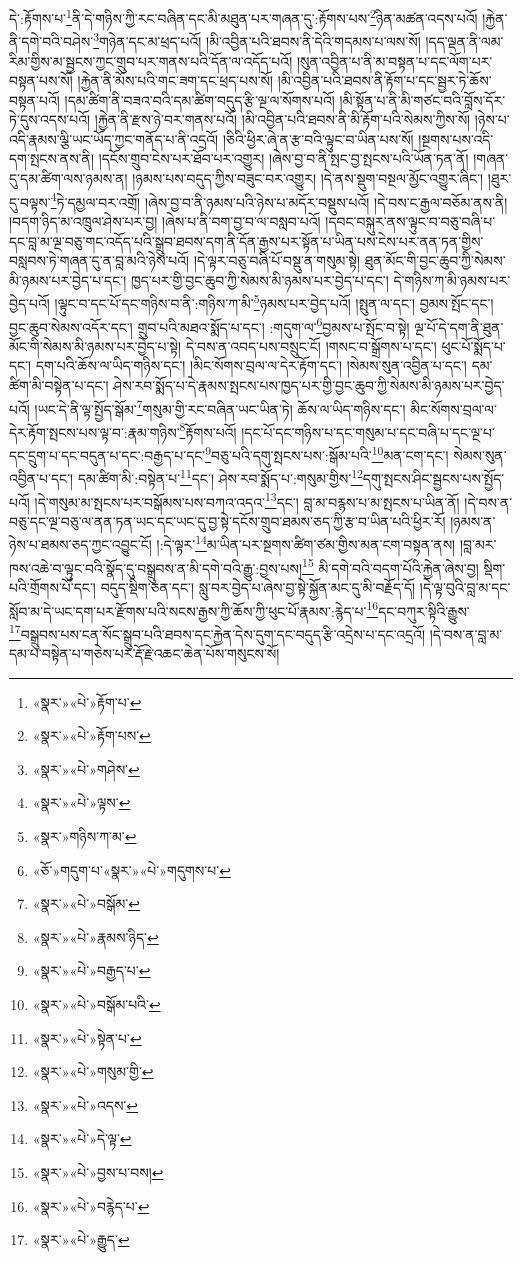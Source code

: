 དེ་:རྟོགས་པ་\footnote{«སྣར་»«པེ་»རྟོག་པ་}ནི་དེ་གཉིས་ཀྱི་རང་བཞིན་དང་མི་མཐུན་པར་གཞན་དུ་:རྟོགས་པས་\footnote{«སྣར་»«པེ་»རྟོག་པས་}ཉིན་མཚན་འདས་པའོ། །རྐྱེན་ནི་དགེ་བའི་བཤེས་\footnote{«སྣར་»«པེ་»གཤེས་}གཉེན་དང་མ་ཕྲད་པའོ། །མི་འབྱིན་པའི་ཐབས་ནི་དེའི་གདམས་པ་ལས་སོ། །དད་ལྡན་ནི་ལམ་རིམ་གྱིས་མ་སྦྱངས་ཀྱང་གྲུབ་པར་གནས་པའི་དོན་ལ་འདོད་པའོ། །སུན་འབྱིན་པ་ནི་མ་བསྟན་པ་དང་ལོག་པར་བསྟན་པས་སོ། །རྐྱེན་ནི་མོས་པའི་གང་ཟག་དང་ཕྲད་པས་སོ། །མི་འབྱིན་པའི་ཐབས་ནི་རྟོག་པ་དང་སྦྱར་ཏེ་ཆོས་བསྟན་པའོ། །དམ་ཚིག་ནི་བཟའ་བའི་དམ་ཚིག་བདུད་རྩི་ལྔ་ལ་སོགས་པའོ། །མི་སྟོན་པ་ནི་མི་གཙང་བའི་བློས་དོར་ཏེ་དུས་འདས་པའོ། །རྐྱེན་ནི་རྫས་ཉེ་བར་གནས་པའོ། །མི་འབྱིན་པའི་ཐབས་ནི་མི་རྟོག་པའི་སེམས་ཀྱིས་སོ། །ཉེས་པ་འདི་རྣམས་ལྕི་ཡང་ཡོད་ཀྱང་གནོད་པ་ནི་འདྲའོ། །ཅིའི་ཕྱིར་ཞེ་ན་རྩ་བའི་ལྟུང་བ་ཡིན་པས་སོ། །སྔགས་པས་འདི་དག་སྤངས་ནས་ནི། །དངོས་གྲུབ་ངེས་པར་ཐོབ་པར་འགྱུར། །ཞེས་བྱ་བ་ནི་སྤང་བྱ་སྤངས་པའི་ཡོན་ཏན་ནོ། །གཞན་དུ་དམ་ཚིག་ལས་ཉམས་ན། །ཉམས་པས་བདུད་ཀྱིས་བཟུང་བར་འགྱུར། །དེ་ནས་སྡུག་བསྔལ་མྱོང་འགྱུར་ཞིང་། །ཐུར་དུ་བལྟས་\footnote{«སྣར་»«པེ་»ལྟས་}ཏེ་དམྱལ་བར་འགྲོ། །ཞེས་བྱ་བ་ནི་ཉམས་པའི་ཉེས་པ་མདོར་བསྡུས་པའོ། །དེ་བས་ང་རྒྱལ་བཅོམ་ནས་ནི། །བདག་ཉིད་མ་འཁྲུལ་ཤེས་པར་བྱ། །ཞེས་པ་ནི་བག་བྱ་བ་ལ་བསླབ་པའོ། །དབང་བསྐུར་ནས་ལྟུང་བ་བཅུ་བཞི་པ་དང་བླ་མ་ལྔ་བཅུ་གང་འདོད་པའི་སྒྲུབ་ཐབས་དག་ནི་དོན་རྒྱས་པར་སྟོན་པ་ཡིན་པས་ངེས་པར་ནན་ཏན་གྱིས་བསླབས་ཏེ་གཞན་དུ་ན་བླ་མའི་ཉེས་པའོ། །དེ་ལྟར་བཅུ་བཞི་པོ་བསྡུ་ན་གསུམ་སྟེ། ཐུན་མོང་གི་བྱང་ཆུབ་ཀྱི་སེམས་མི་ཉམས་པར་བྱེད་པ་དང་། ཁྱད་པར་གྱི་བྱང་ཆུབ་ཀྱི་སེམས་མི་ཉམས་པར་བྱེད་པ་དང་། དེ་གཉིས་ཀ་མི་ཉམས་པར་བྱེད་པའོ། །ལྟུང་བ་དང་པོ་དང་གཉིས་བ་ནི་:གཉིས་ཀ་མི་\footnote{«སྣར་»གཉིས་ཀ་མ་}ཉམས་པར་བྱེད་པའོ། །སྤུན་ལ་དང་། བྱམས་སྤོང་དང་། བྱང་ཆུབ་སེམས་འདོར་དང་། གྲུབ་པའི་མཐའ་སྨོད་པ་དང་། :གདུག་ལ་\footnote{«ཅོ་»གདུག་པ་«སྣར་»«པེ་»གདུགས་པ་}བྱམས་པ་སྤོང་བ་སྟེ། ལྔ་པོ་དེ་དག་ནི་ཐུན་མོང་གི་སེམས་མི་ཉམས་པར་བྱེད་པ་སྟེ། དེ་བས་ན་འབད་པས་བསྲུང་ངོ། །གསང་བ་སྒྲོགས་པ་དང་། ཕུང་པོ་སྨོད་པ་དང་། དག་པའི་ཆོས་ལ་ཡིད་གཉིས་དང་། །མིང་སོགས་བྲལ་ལ་དེར་རྟོག་དང་། །སེམས་སུན་འབྱིན་པ་དང་། དམ་ཚིག་མི་བསྟེན་པ་དང་། ཤེས་རབ་སྨོད་པ་དེ་རྣམས་སྤངས་པས་ཁྱད་པར་གྱི་བྱང་ཆུབ་ཀྱི་སེམས་མི་ཉམས་པར་བྱེད་པའོ། །ཡང་དེ་ནི་ལྟ་སྤྱོད་སྒོམ་\footnote{«སྣར་»«པེ་»བསྒོམ་}གསུམ་གྱི་རང་བཞིན་ཡང་ཡིན་ཏེ། ཆོས་ལ་ཡིད་གཉིས་དང་། མིང་སོགས་བྲལ་ལ་དེར་རྟོག་སྤངས་པས་ལྟ་བ་:རྣམ་གཉིས་\footnote{«སྣར་»«པེ་»རྣམས་ཉིད་}རྟོགས་པའོ། །དང་པོ་དང་གཉིས་པ་དང་གསུམ་པ་དང་བཞི་པ་དང་ལྔ་པ་དང་དྲུག་པ་དང་བདུན་པ་དང་:བརྒྱད་པ་དང་\footnote{«སྣར་»«པེ་»བརྒྱད་པ་}བཅུ་པའི་དགུ་སྤངས་པས་:སྒོམ་པའི་\footnote{«སྣར་»«པེ་»བསྒོམ་པའི་}མན་ངག་དང་། སེམས་སུན་འབྱིན་པ་དང་། དམ་ཚིག་མི་:བསྟེན་པ་\footnote{«སྣར་»«པེ་»སྟེན་པ་}དང་། ཤེས་རབ་སྨོད་པ་:གསུམ་གྱིས་\footnote{«སྣར་»«པེ་»གསུམ་གྱི་}དགུ་སྤངས་ཤིང་སྦྱངས་པས་སྤྱོད་པའོ། །དེ་གསུམ་མ་སྤངས་པར་བསྒོམས་པས་བཀའ་འདའ་\footnote{«སྣར་»«པེ་»འདས་}དང་། བླ་མ་བརྙས་པ་མ་སྤངས་པ་ཡིན་ནོ། །དེ་བས་ན་བཅུ་དང་ལྔ་བཅུ་ལ་ནན་ཏན་ཡང་དང་ཡང་དུ་བྱ་སྟེ་དངོས་གྲུབ་ཐམས་ཅད་ཀྱི་རྩ་བ་ཡིན་པའི་ཕྱིར་རོ། །ཉམས་ན་ཉེས་པ་ཐམས་ཅད་ཀྱང་འབྱུང་ངོ། །:དེ་ལྟར་\footnote{«སྣར་»«པེ་»དེ་ལྟ་}མ་ཡིན་པར་སྔགས་ཚིག་ཙམ་གྱིས་མན་ངག་བསྟན་ནས། །བླ་མར་ཁས་འཆེ་བ་ལྟུང་བའི་སྣོད་དུ་བསྒྲུབས་ན་མི་དགེ་བའི་རྒྱུ་:བྱས་པས།\footnote{«སྣར་»«པེ་»བྱས་པ་བས།} མི་དགེ་བའི་བདག་པོའི་རྐྱེན་ཞེས་བྱ། སྡིག་པའི་གྲོགས་པོ་དང་། བདུད་སྡིག་ཅན་དང་། སླུ་བར་བྱེད་པ་ཞེས་བྱ་སྟེ་སྐྱོན་མང་དུ་མི་བརྗོད་དོ། །དེ་ལྟ་བུའི་བླ་མ་དང་སློབ་མ་དེ་ཡང་དག་པར་རྫོགས་པའི་སངས་རྒྱས་ཀྱི་ཆོས་ཀྱི་ཕུང་པོ་རྣམས་:རྙེད་པ་\footnote{«སྣར་»«པེ་»བརྙེད་པ་}དང་བཀུར་སྟིའི་རྒྱུས་\footnote{«སྣར་»«པེ་»རྒྱུད་}བསྒྲུབས་པས་ངན་སོང་སྒྲུབ་པའི་ཐབས་དང་རྐྱེན་དེས་དུག་དང་བདུད་རྩི་འདྲེས་པ་དང་འདྲའོ། །དེ་བས་ན་བླ་མ་དམ་པ་བསྟེན་པ་གཅེས་པར་རྡོ་རྗེ་འཆང་ཆེན་པོས་གསུངས་སོ། 